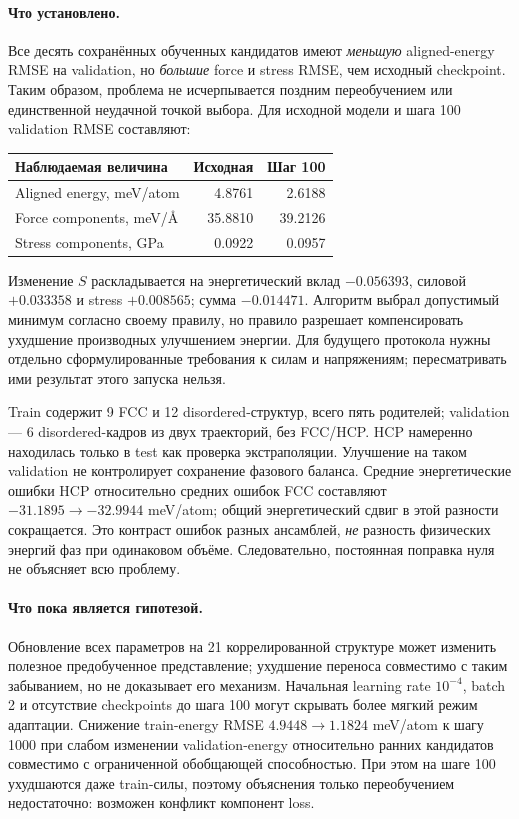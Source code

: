 \documentclass[11pt,a4paper]{article}
\begin{document}
\paragraph{Что установлено.}
Все десять сохранённых обученных кандидатов имеют \emph{меньшую}
aligned-energy RMSE на validation, но \emph{большие} force и stress RMSE,
чем исходный checkpoint. Таким образом, проблема не исчерпывается
поздним переобучением или единственной неудачной точкой выбора.
Для исходной модели и шага 100 validation RMSE составляют:
\begin{center}
\begin{tabular}{lrr}
\toprule
Наблюдаемая величина & Исходная & Шаг 100\\
\midrule
Aligned energy, meV/atom & 4.8761 & 2.6188\\
Force components, meV/\AA & 35.8810 & 39.2126\\
Stress components, GPa & 0.0922 & 0.0957\\
\bottomrule
\end{tabular}
\end{center}
Изменение $S$ раскладывается на энергетический вклад $-0.056393$,
силовой $+0.033358$ и stress $+0.008565$; сумма $-0.014471$.
Алгоритм выбрал допустимый минимум согласно своему правилу,
но правило разрешает компенсировать ухудшение производных улучшением энергии.
Для будущего протокола нужны отдельно сформулированные требования к
силам и напряжениям; пересматривать ими результат этого запуска нельзя.

Train содержит 9 FCC и 12 disordered-структур, всего пять родителей;
validation --- 6 disordered-кадров из двух траекторий, без FCC/HCP.
HCP намеренно находилась только в test как проверка экстраполяции.
Улучшение на таком validation не контролирует сохранение фазового баланса.
Средние энергетические ошибки HCP относительно средних ошибок FCC
составляют $-31.1895\to-32.9944$ meV/atom; общий энергетический сдвиг
в этой разности сокращается. Это контраст ошибок разных ансамблей,
\emph{не} разность физических энергий фаз при одинаковом объёме.
Следовательно, постоянная поправка нуля не объясняет всю проблему.

\paragraph{Что пока является гипотезой.}
Обновление всех параметров на 21 коррелированной структуре может
изменить полезное предобученное представление; ухудшение переноса
совместимо с таким забыванием, но не доказывает его механизм.
Начальная learning rate $10^{-4}$, batch 2 и отсутствие checkpoints
до шага 100 могут скрывать более мягкий режим адаптации.
Снижение train-energy RMSE $4.9448\to1.1824$ meV/atom к шагу 1000
при слабом изменении validation-energy относительно ранних кандидатов
совместимо с ограниченной обобщающей способностью. При этом на шаге 100
ухудшаются даже train-силы, поэтому объяснения только переобучением
недостаточно: возможен конфликт компонент loss.
\end{document}
